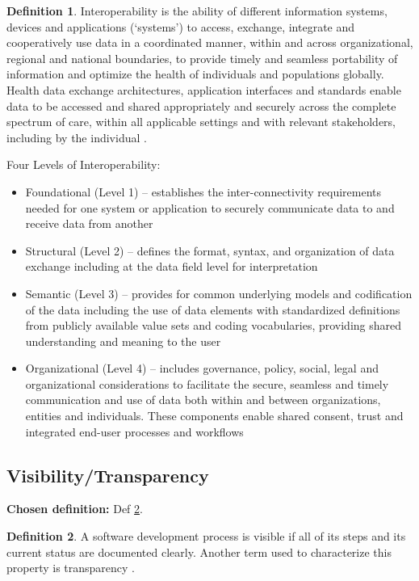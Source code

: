\documentclass[letterpaper,cleveref]{lipics-v2019}
\theoremstyle{definition}
\newtheorem{defn}{Definition}
\begin{document}
\begin{defn}
\label{InteroperabilitySelected}
Interoperability is the ability of different information systems, devices and
applications (‘systems’) to access, exchange, integrate and cooperatively use
data in a coordinated manner, within and across organizational, regional and
national boundaries, to provide timely and seamless portability of information
and optimize the health of individuals and populations globally. Health data
exchange architectures, application interfaces and standards enable data to be
accessed and shared appropriately and securely across the complete spectrum of
care, within all applicable settings and with relevant stakeholders, including
by the individual \citep{HIMSS2019}.
        
Four Levels of Interoperability:
\begin{itemize}
\item Foundational (Level 1) – establishes the inter-connectivity requirements
needed for one system or application to securely communicate data to and receive
data from another

\item Structural (Level 2) – defines the format, syntax, and organization of
data exchange including at the data field level for interpretation

\item Semantic (Level 3) – provides for common underlying models and
codification of the data including the use of data elements with standardized
definitions from publicly available value sets and coding vocabularies,
providing shared understanding and meaning to the user

\item Organizational (Level 4) – includes governance, policy, social, legal and
organizational considerations to facilitate the secure, seamless and timely
communication and use of data both within and between organizations, entities
and individuals. These components enable shared consent, trust and integrated
end-user processes and workflows
\end{itemize}
\end{defn}

\subsection{Visibility/Transparency}
\noindent \textbf{Chosen definition:} Def \ref{VisibilitySelected}.

\begin{defn}
\label{VisibilitySelected}
A software development process is visible if all of its steps and its current
status are documented clearly. Another term used to characterize this property
is transparency \citep{ghezzi1991fundamentals}.
\end{defn}
      
\end{document}

